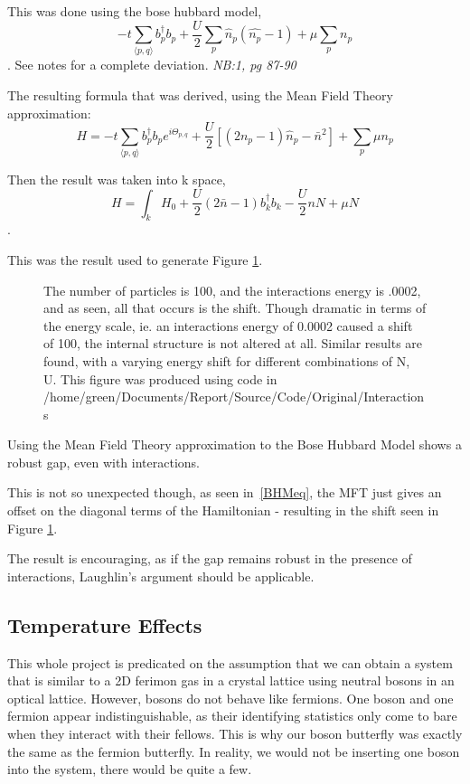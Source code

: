 \documentclass[12pt]{article}
\begin{document}
This was done using the bose hubbard model, 
\[
-t \sum_{\langle p, q \rangle} b_p^\dagger b_p + \frac{U}{2} \sum_p \hat{n}_p
(\hat{n_p} - 1) +\mu \sum_p n_p
\].
See notes for a complete deviation. \textit{NB:1, pg 87-90}

The resulting formula that was derived, using the Mean Field Theory approximation:
\begin{equation} 
H = -t \sum_{\langle p, q \rangle} b_p^\dagger b_p e^{i \Theta_{p,q}} +
\frac{U}{2} [ (2n_p -1)\hat{n}_p - \bar{n}^2] +\sum_p \mu n_p
\end{equation}

Then the result was taken into k space,
\begin{equation} \label{BHMeq}
H = \int_k  H_0 +\frac{U}{2} (2\bar{n}-1)b_k^\dagger b_k -\frac{U}{2} n N +
\mu N
\end{equation}.

This was the result used to generate Figure \ref{BHMfig}.


\begin{figure}[H]
	\centerline{}
	\caption{ The number of particles is 100, and the interactions energy is .0002, and as
		seen, all that occurs is the shift. Though dramatic in terms of the energy scale,
		ie. an interactions energy of 0.0002 caused a shift of 100, the internal 
		structure is not altered at all. Similar results are found, with a varying 
		energy shift for different combinations of N, U. This figure was
		produced using code in /home/green/Documents/Report/Source/Code/Original/Interactions}
	\label{BHMfig}
\end{figure}


Using the Mean Field Theory approximation to the Bose Hubbard Model shows a
robust gap, even with interactions.

This is not so unexpected though, as seen in~\eqref{BHMeq}, the MFT just gives
an offset on the diagonal terms of the Hamiltonian - resulting in the shift
seen in Figure \ref{BHMfig}.

The result is encouraging, as if the gap remains robust in the presence of
interactions, Laughlin's argument should be applicable.
\subsection{Temperature Effects}
This whole project is predicated on the assumption that we can obtain a system
that is similar to a 2D ferimon gas in a crystal lattice using neutral bosons
in an optical lattice. However, bosons do not behave like fermions.
One boson and one fermion appear indistinguishable, as their identifying
statistics only come to bare when they interact with their fellows. This is
why our boson butterfly was exactly the same as the fermion butterfly.
In reality, we would not be inserting one boson into the system, there would
be quite a few.
\end{document}
